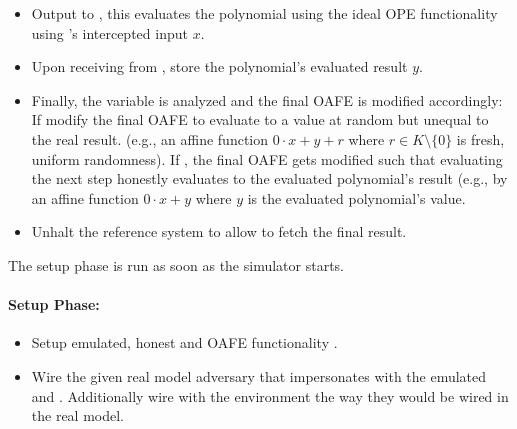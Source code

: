 \begin{itemize}

  \item Output  to \JWfuncSymOPEnp{}, this evaluates the
    polynomial using the ideal OPE functionality using \JWpTwo{}'s intercepted
    input $x$.

  \item Upon receiving  from \JWfuncSymOPEnp{}, store
    the polynomial's evaluated result $y$.

  \item Finally, the variable  is analyzed and the final OAFE is
    modified accordingly: If  modify the final OAFE to
    evaluate to a value at random but unequal to the real result. (e.g., an
    affine function $0 \cdot x + y + r$ where $r \in K \setminus \{0\}$ is
    fresh, uniform randomness). If , the final OAFE
    gets modified such that evaluating the next step honestly evaluates to the
    evaluated polynomial's result (e.g., by an affine function $0 \cdot x + y$
    where $y$ is the evaluated polynomial's value.

  \item Unhalt the reference system to allow \JWadv{} to fetch the final
    result.

\end{itemize}


\label{sec:simulator-goliath}

The setup phase is run as soon as the simulator starts.

\paragraph{Setup Phase:}

\begin{itemize}

  \item Setup emulated, honest \JWpTwo{} and OAFE functionality
    \JWfuncSymOAFE{}.

  \item Wire the given real model adversary \JWadv{} that impersonates \JWpOne{}
    with the emulated \JWpTwo{} and \JWfuncSymOAFE{}. Additionally wire \JWadv{}
    with the environment the way they would be wired in the real model.

\end{itemize}

